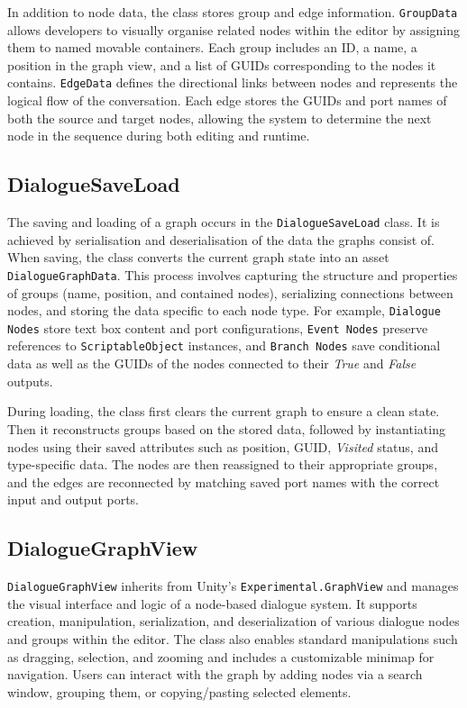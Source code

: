 In addition to node data, the class stores group and edge information. \verb|GroupData| allows developers to visually organise related nodes within the editor by assigning them to named movable containers. Each group includes an ID, a name, a position in the graph view, and a list of GUIDs corresponding to the nodes it contains. \verb|EdgeData| defines the directional links between nodes and represents the logical flow of the conversation. Each edge stores the GUIDs and port names of both the source and target nodes, allowing the system to determine the next node in the sequence during both editing and runtime.


\subsection{DialogueSaveLoad}
\label{devlog:DialogueSaveLoad}
The saving and loading of a graph occurs in the \verb|DialogueSaveLoad| class. It is achieved by serialisation and deserialisation of the data the graphs consist of. When saving, the class converts the current graph state into an asset \verb|DialogueGraphData|. This process involves capturing the structure and properties of groups (name, position, and contained nodes), serializing connections between nodes, and storing the data specific to each node type. For example, \verb|Dialogue Nodes| store text box content and port configurations, \verb|Event Nodes| preserve references to \verb|ScriptableObject| instances, and \verb|Branch Nodes| save conditional data as well as the GUIDs of the nodes connected to their \textit{True} and \textit{False} outputs.

During loading, the class first clears the current graph to ensure a clean state. Then it reconstructs groups based on the stored data, followed by instantiating nodes using their saved attributes such as position, GUID, \textit{Visited} status, and type-specific data. The nodes are then reassigned to their appropriate groups, and the edges are reconnected by matching saved port names with the correct input and output ports.


\subsection{DialogueGraphView}
\label{devlog:DialogueGraphView}
\verb|DialogueGraphView| inherits from Unity's \verb|Experimental.GraphView| and manages the visual interface and logic of a node-based dialogue system. It supports creation, manipulation, serialization, and deserialization of various dialogue nodes and groups within the editor. The class also enables standard manipulations such as dragging, selection, and zooming and includes a customizable minimap for navigation. Users can interact with the graph by adding nodes via a search window, grouping them, or copying/pasting selected elements. 

